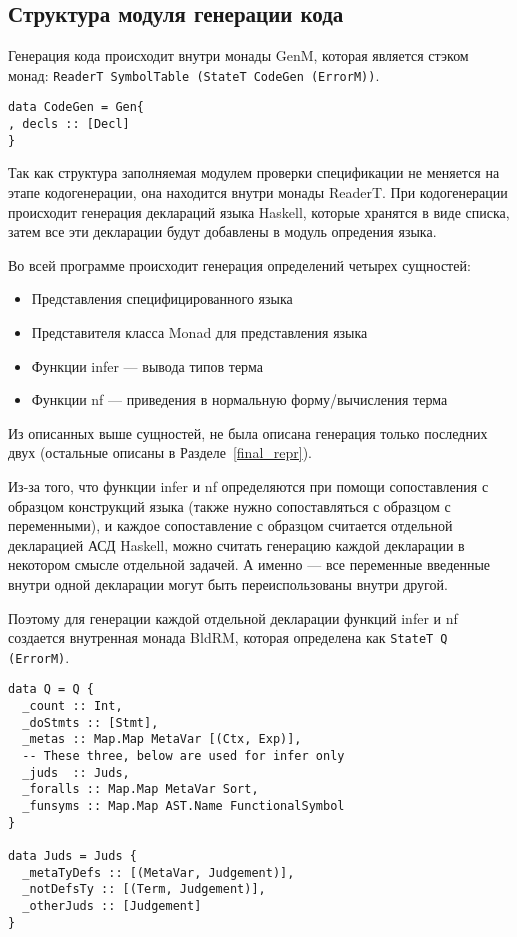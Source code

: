 \subsection{Структура модуля генерации кода}\label{repr}
Генерация кода происходит внутри монады GenM, которая является стэком монад: \lstinline{ReaderT SymbolTable (StateT CodeGen (ErrorM))}.

\begin{lstlisting}[caption={Структура используемая при кодогенерации},captionpos=b,frame=single]
data CodeGen = Gen{
, decls :: [Decl]
}
\end{lstlisting}

Так как структура заполняемая модулем проверки спецификации не меняется на этапе кодогенерации, она находится внутри монады ReaderT. При кодогенерации происходит генерация деклараций языка Haskell, которые хранятся в виде списка, затем все эти декларации будут добавлены в модуль опредения языка.

Во всей программе происходит генерация определений четырех сущностей:
\begin{itemize}
\item Представления специфицированного языка
\item Представителя класса Monad для представления языка
\item Функции infer --- вывода типов терма
\item Функции nf --- приведения в нормальную форму/вычисления терма
\end{itemize}

Из описанных выше сущностей, не была описана генерация только последних двух (остальные описаны в Разделе~\ref{final_repr}).

Из-за того, что функции infer и nf определяются при помощи сопоставления с образцом конструкций языка (также нужно сопоставляться с образцом с переменными), и каждое сопоставление с образцом считается отдельной декларацией АСД Haskell, можно считать генерацию каждой декларации в некотором смысле отдельной задачей. А именно --- все переменные введенные внутри одной декларации могут быть переиспользованы внутри другой.

Поэтому для генерации каждой отдельной декларации функций infer и nf создается внутренная монада BldRM, которая определена как \lstinline{StateT Q (ErrorM)}.

\begin{lstlisting}[caption={Структура используемая при кодогенерации функций infer и nf},captionpos=b,frame=single]
data Q = Q {
  _count :: Int,
  _doStmts :: [Stmt],
  _metas :: Map.Map MetaVar [(Ctx, Exp)],
  -- These three, below are used for infer only
  _juds  :: Juds,
  _foralls :: Map.Map MetaVar Sort,
  _funsyms :: Map.Map AST.Name FunctionalSymbol
}

data Juds = Juds {
  _metaTyDefs :: [(MetaVar, Judgement)],
  _notDefsTy :: [(Term, Judgement)],
  _otherJuds :: [Judgement]
}
\end{lstlisting}

